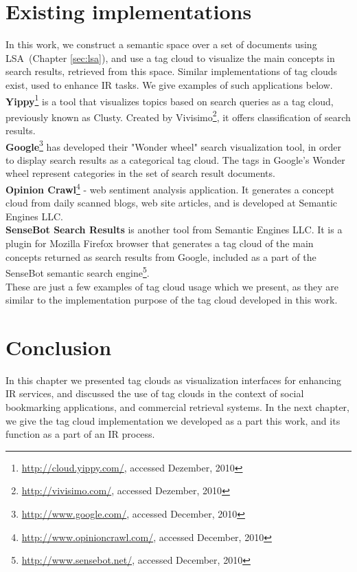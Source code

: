 \section{Existing implementations}
In this work, we construct a semantic space over a set of documents using \gls{LSA}~(Chapter \ref{sec:lsa}), and use a tag cloud to visualize the main concepts in search results, retrieved from this space. Similar implementations of tag clouds exist, used to enhance \gls{IR} tasks. We give  examples of such applications below. \\

\textbf{Yippy}\footnote{\url{http://cloud.yippy.com/}, accessed Dezember, 2010} is a tool that visualizes topics based on search queries as a tag cloud, previously known as Clusty. Created by Vivisimo\footnote{\url{http://vivisimo.com/}, accessed Dezember, 2010}, it offers classification of search results. \\

\textbf{Google}\footnote{\url{http://www.google.com/}, accessed December, 2010} has developed their "Wonder wheel" search visualization tool, in order to display search results as a categorical tag cloud. The tags in Google's Wonder wheel represent categories in the set of search result documents. \\ 

\textbf{Opinion Crawl}\footnote{\url{http://www.opinioncrawl.com/}, accessed December, 2010} - web sentiment analysis application. It generates a concept cloud from daily scanned blogs, web site articles, and is developed at Semantic Engines LLC.\\

\textbf{SenseBot Search Results} is another tool from Semantic Engines LLC. It is a plugin for Mozilla Firefox browser that generates a tag cloud of the main concepts returned as search results from Google, included as a part of the SenseBot semantic search engine\footnote{\url{http://www.sensebot.net/}, accessed December, 2010}.\\

These are just a few examples of tag cloud usage which we present, as they are similar to the implementation purpose of the tag cloud developed in this work.  \\

\section{Conclusion}
In this chapter we presented tag clouds as visualization interfaces for enhancing \gls{IR} services, and discussed the use of tag clouds in the context of social bookmarking applications, and commercial retrieval systems. In the next chapter, we give the tag cloud implementation we developed as a part this work, and its function as a part of an \gls{IR} process. \\

